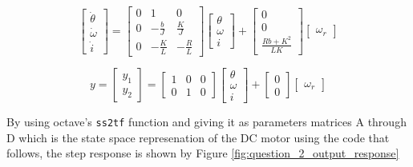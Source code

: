 \documentclass[a4paper, 12pt]{article}
\begin{document}
\begin{equation}
  \left[
  \begin{array}{c}
    \dot \theta \\
    \dot \omega \\
    \dot i
  \end{array}
  \right]
  =
  \left[
  \begin{array}{ccc}
    0 & 1 & 0 \\
    0 & -\frac{b}{J} & \frac{K}{J} \\
    0 & -\frac{K}{L} & -\frac{R}{L}
  \end{array}
  \right]
  \left[
  \begin{array}{c}
    \theta \\
    \omega \\
    i
  \end{array}
  \right]
  +
  \left[
  \begin{array}{c}
    0 \\
    0 \\
    \frac{Rb + K^2}{LK}
  \end{array}
  \right]
  \left[
  \begin{array}{c}
    \omega_r
  \end{array}
  \right]
  \label{eq:ss_position_eq1}
\end{equation}

\begin{equation}
  y =
  \left[
  \begin{array}{rcl}
	  y_1 \\
	  y_2
  \end{array}
  \right]
  =
  \left[
  \begin{array}{ccc}
    1 & 0 & 0 \\
    0 & 1 & 0
  \end{array}
  \right]
  \left[
  \begin{array}{c}
    \theta \\
    \omega \\
    i
  \end{array}
  \right]
  +
  \left[
  \begin{array}{c}
    0 \\
    0
  \end{array}
  \right]
  \left[
  \begin{array}{c}
    \omega_r
  \end{array}
  \right]
  \label{eq:ss_position_eq2}
\end{equation}

By using octave's \texttt{ss2tf} function and giving it as parameters matrices A through D which is the state space represenation of the DC motor using the code that follows, the step response is shown by Figure \ref{fig:question_2_output_response}\par
\end{document}
